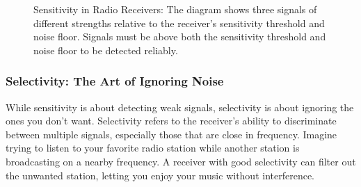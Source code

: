 \begin{figure}[h]
    \centering
    \caption{Sensitivity in Radio Receivers: The diagram shows three signals of different strengths relative to the receiver's sensitivity threshold and noise floor. Signals must be above both the sensitivity threshold and noise floor to be detected reliably.}
    \label{fig:sensitivity-diagram}
\end{figure}

\subsubsection*{Selectivity: The Art of Ignoring Noise}
While sensitivity is about detecting weak signals, selectivity is about ignoring the ones you don’t want. Selectivity refers to the receiver’s ability to discriminate between multiple signals, especially those that are close in frequency. Imagine trying to listen to your favorite radio station while another station is broadcasting on a nearby frequency. A receiver with good selectivity can filter out the unwanted station, letting you enjoy your music without interference.

